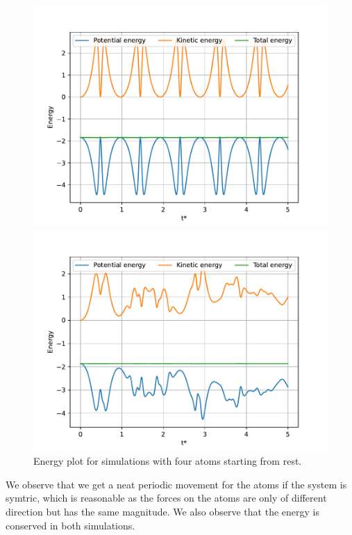 \documentclass[a4paper,10pt,english]{article}
\begin{document}
\begin{figure}[h]
    \centering
    \begin{minipage}{0.5\textwidth}
        \centering
        \includegraphics[width=1.05\textwidth]{../figures/3_b_iv.pdf}
    \end{minipage}\hfill
    \begin{minipage}{0.5\textwidth}
        \centering
        \includegraphics[width=1.05\textwidth]{../figures/3_b_v.pdf}
    \end{minipage}
    \caption{Energy plot for simulations with four atoms starting from rest.}
    \label{fig:energyplots3}
\end{figure}

We observe that we get a neat periodic movement for the atoms if the system is symtric, which is reasonable as the forces on the atoms are only of different direction but has the same magnitude. We also observe that the energy is conserved in both simulations.
\end{document}
